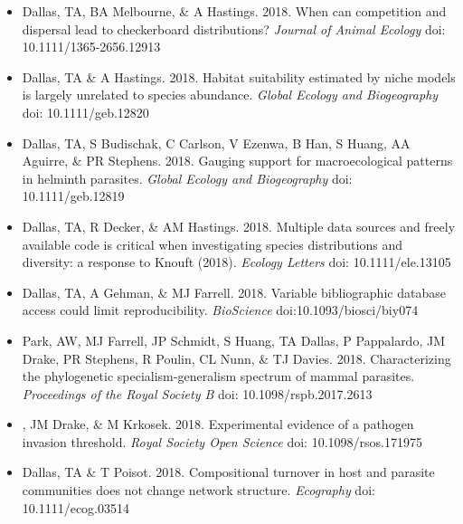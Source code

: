 \documentclass[]{CV}
\begin{document}
{}
\begin{itemize}

\item {\mefont Dallas, TA}, BA Melbourne, \& A Hastings. 2018. When can competition and dispersal lead to checkerboard distributions? \textit{Journal of Animal Ecology} doi: 10.1111/1365-2656.12913

\item {\mefont Dallas, TA} \& A Hastings. 2018. Habitat suitability estimated by niche models is largely unrelated to species abundance. \textit{Global Ecology and Biogeography} doi: 10.1111/geb.12820

\item {\mefont Dallas, TA}, S Budischak, C Carlson, V Ezenwa, B Han, S Huang, AA Aguirre, \& PR Stephens. 2018. Gauging support for macroecological patterns in helminth parasites. \textit{Global Ecology and Biogeography} doi: 10.1111/geb.12819

\item {\mefont Dallas, TA}, R Decker, \& AM Hastings. 2018. Multiple data sources and freely available code is critical when investigating species distributions and diversity: a response to Knouft (2018). \textit{Ecology Letters} doi: 10.1111/ele.13105

\item {\mefont Dallas, TA}, A Gehman, \& MJ Farrell. 2018. Variable bibliographic database access could limit reproducibility. \textit{BioScience} doi:10.1093/biosci/biy074

\item Park, AW, MJ Farrell, JP Schmidt, S Huang, {\mefont TA Dallas}, P Pappalardo, JM Drake, PR Stephens, R Poulin, CL Nunn, \& TJ Davies. 2018. Characterizing the phylogenetic specialism-generalism spectrum of mammal parasites. \textit{Proceedings of the Royal Society B} doi: 10.1098/rspb.2017.2613

\item {}, JM Drake, \& M Krkosek. 2018. Experimental evidence of a pathogen invasion threshold. \textit{Royal Society Open Science} doi: 10.1098/rsos.171975

\item {\mefont Dallas, TA} \& T Poisot. 2018. Compositional turnover in host and parasite communities does not change network structure. \textit{Ecography} doi: 10.1111/ecog.03514

\end{itemize}
\end{document}
